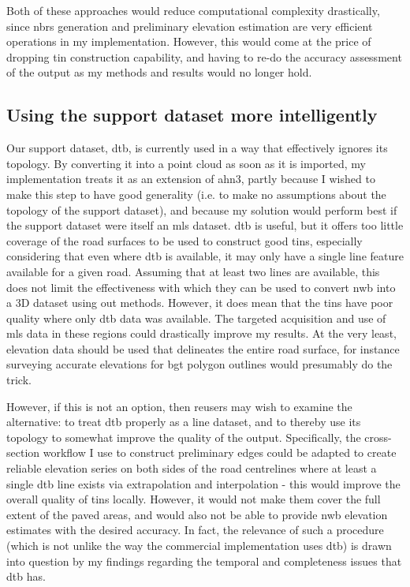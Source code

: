 Both of these approaches would reduce computational complexity drastically, since \ac{nbrs} generation and preliminary elevation estimation are very efficient operations in my implementation. However, this would come at the price of dropping \ac{tin} construction capability, and having to re-do the accuracy assessment of the output as my methods and results would no longer hold.

\subsection{Using the support dataset more intelligently}
\label{sub:improvementssupportdataset}

Our support dataset, \ac{dtb}, is currently used in a way that effectively ignores its topology. By converting it into a point cloud as soon as it is imported, my implementation treats it as an extension of \ac{ahn3}, partly because I wished to make this step to have good generality (i.e. to make no assumptions about the topology of the support dataset), and because my solution would perform best if the support dataset were itself an \ac{mls} dataset. \ac{dtb} is useful, but it offers too little coverage of the road surfaces to be used to construct good \ac{tin}s, especially considering that even where \ac{dtb} is available, it may only have a single line feature available for a given road. Assuming that at least two lines are available, this does not limit the effectiveness with which they can be used to convert \ac{nwb} into a 3D dataset using out methods. However, it does mean that the \ac{tin}s have poor quality where only \ac{dtb} data was available. The targeted acquisition and use of \ac{mls} data in these regions could drastically improve my results. At the very least, elevation data should be used that delineates the entire road surface, for instance surveying accurate elevations for \ac{bgt} polygon outlines would presumably do the trick.

However, if this is not an option, then reusers may wish to examine the alternative: to treat \ac{dtb} properly as a line dataset, and to thereby use its topology to somewhat improve the quality of the output. Specifically, the cross-section workflow I use to construct preliminary edges could be adapted to create reliable elevation series on both sides of the road centrelines where at least a single \ac{dtb} line exists via extrapolation and interpolation - this would improve the overall quality of \ac{tin}s locally. However, it would not make them cover the full extent of the paved areas, and would also not be able to provide \ac{nwb} elevation estimates with the desired accuracy. In fact, the relevance of such a procedure (which is not unlike the way the commercial implementation uses \ac{dtb}) is drawn into question by my findings regarding the temporal and completeness issues that \ac{dtb} has.